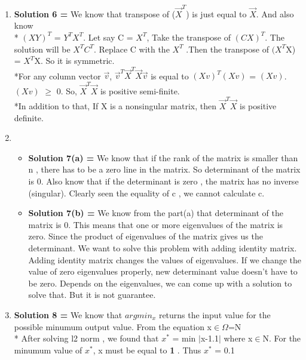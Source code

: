 \documentclass[11pt]{article}
\begin{document}
\begin{enumerate}
\item \textbf{Solution 6 = } We know that transpose of ($\vec{X}^{T}$) is just equal to $\vec{X}$. And also know \\* $(XY)^{T}$ = $Y^{T}$$X^{T}$. Let say C = $X^{T}$, Take the transpose of $(CX)^{T}$. The solution will be $X^{T}$$C^{T}$. Replace C with the $X^{T}$ .Then the transpose of $(X^{T}$X) = $X^{T}$X. So it is symmetric.
\\*For any column vector $\vec{v}$,  $\vec{v}^{T}$$\vec{X}^{T}$$\vec{X}$$\vec{v}$ is equal to $(Xv)^{T}$$(Xv)$ = $(Xv)$.$(Xv)$ $\geq$ 0. So, $\vec{X}^{T}$$\vec{X}$ is positive semi-finite. \\*In addition to that, If X is a nonsingular matrix, then $\vec{X}^{T}$$\vec{X}$ is positive definite.

\item 
\begin{itemize}
    \item  \textbf{Solution 7(a) = } We know that if the rank of the matrix is smaller than n , there has to be a zero line in the matrix. So determinant of the matrix is 0. Also know that if the determinant is zero , the matrix has no inverse (singular). Clearly seen the equality of c , we cannot calculate c.
    \item  \textbf{Solution 7(b) = } We know from the part(a) that determinant of the matrix is 0. This means that one or more eigenvalues of the matrix is zero. Since the product of eigenvalues of the matrix gives us the determinant. We want to solve this problem with adding identity matrix. Adding identity matrix changes the values of eigenvalues.  If we change the value of zero eigenvalues properly, new determinant value doesn't have to be zero. Depends on the eigenvalues, we can come up with a solution to solve that. But it is not guarantee. 
\end{itemize} 

\item  \textbf{Solution 8 = } We know that ${argmin_x} $ returns the input value for the possible minumum output value. From the equation x$\in$$\Omega$=N 
\\* After solving l2 norm , we found that $x^{*}$ = min $\mid$x-1.1$\mid$  where x$\in$N. For the minumum value of  $x^{*}$, x must be equal to \textbf{1} . Thus $x^{*}$ = 0.1

\end{enumerate}
\end{document}
